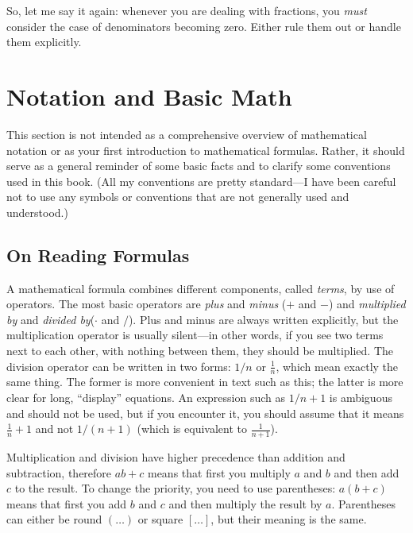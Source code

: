 So, let me say it again: whenever you are dealing with fractions, you
\emph{must} consider the case of denominators becoming zero.  Either
rule them out or handle them explicitly.

\section{Notation and Basic Math}


This section is not intended as a comprehensive overview of
mathematical notation or as your first introduction to mathematical
formulas. Rather, it should serve as a general reminder of some basic
facts and to clarify some conventions used in this book. (All my
conventions are pretty standard---I have been careful not to use any
symbols or conventions that are not generally used and understood.)

\subsection{On Reading Formulas}


A mathematical formula combines different components, called
\emph{terms}, by use of operators. The most basic operators are
\emph{plus} and \emph{minus} ($+$ and $-$) and \emph{multiplied by}
and \emph{divided by}\break ($\cdot$ and $/$). Plus and minus are always
written explicitly, but the multiplication operator is usually
silent---in other words, if you see two terms next to each other, with
nothing between them, they should be multiplied. The division operator
can be written in two forms: $1/n$ or $\frac{1}{n}$, which mean
exactly the same thing. The former is more convenient in text such as
this; the latter is more clear for long, ``display'' equations. An
expression such as $1/n + 1$ is ambiguous and should not be used, but
if you encounter it, you should assume that it means $\frac{1}{n} + 1$
and not $1/(n+1)$ (which is equivalent to $\frac{1}{n+1}$).

Multiplication and division have higher precedence than addition and
subtraction, therefore $a b + c$ means that first you multiply $a$ and
$b$ and then add $c$ to the result.  To change the priority, you need
to use parentheses: $a (b+c)$ means that first you add $b$ and $c$ and
then multiply the result by $a$. Parentheses can either be round
$(\dots)$ or square $[\dots]$, but their meaning is the same.

